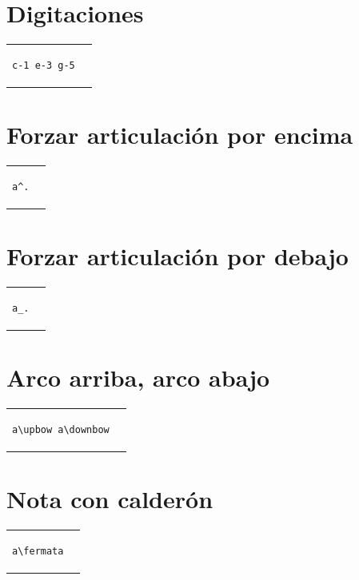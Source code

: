 \documentclass[10pt,a4paper,oneside,headinclude,titlepage]{scrartcl}
\begin{document}
\section*{Digitaciones}
\begin{tabular}{m{2cm}m{2cm}}
\begin{verbatim}
c-1 e-3 g-5
\end{verbatim}
&
\begin[fragment,relative=1,notime]{lilypond}
c-1 e-3 g-5
\end{lilypond}
\end{tabular}

\section*{Forzar articulación por encima}
\begin{tabular}{m{2cm}m{2cm}}
\begin{verbatim}
a^.
\end{verbatim}
&
\begin[fragment,notime]{lilypond}
a^.
\end{lilypond}
\end{tabular}

\section*{Forzar articulación por debajo}
\begin{tabular}{m{2cm}m{2cm}}
\begin{verbatim}
a_.
\end{verbatim}
&
\begin[fragment,notime]{lilypond}
a_.
\end{lilypond}
\end{tabular}

\section*{Arco arriba, arco abajo}
\begin{tabular}{m{3cm}m{2cm}}
\begin{verbatim}
a\upbow a\downbow
\end{verbatim}
&
\begin[fragment,notime]{lilypond}
a\upbow a\downbow
\end{lilypond}
\end{tabular}

\section*{Nota con calderón}
\begin{tabular}{m{3cm}m{2cm}}
\begin{verbatim}
a\fermata
\end{verbatim}
&
\begin[fragment,notime]{lilypond}
a\fermata
\end{lilypond}
\end{tabular}
\end{document}
